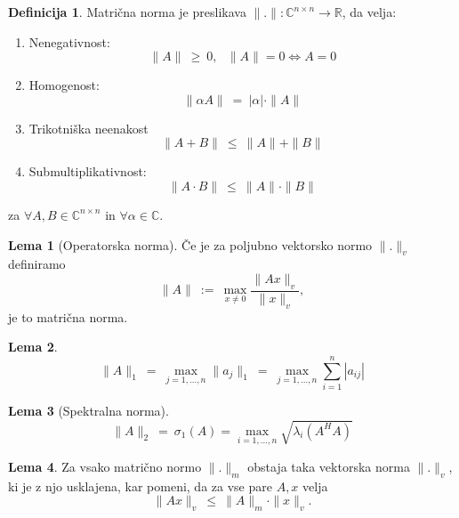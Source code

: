 \documentclass[11pt]{article}
\theoremstyle{definition}
\newtheorem{definicija}{Definicija}[section]
\newtheorem{lema}{Lema}
\begin{document}
\pagebreak

\begin{definicija}

Matrična norma je preslikava $\|.\|: \mathbb{C}^{n \times n} \rightarrow \mathbb{R}$, da velja:
\begin{enumerate}
	\item[1)] Nenegativnost:
	$$\|A\| ~\geq~ 0, ~~~\|A\| = 0 \iff A = 0$$
	\item[2)]Homogenost:
	 $$\|\alpha A\| ~=~ |\alpha| \cdot \|A\|$$
	\item[3)] Trikotniška neenakost
	$$\|A + B\| ~\leq~ \|A\| + \|B\|$$
	\item[4)] Submultiplikativnost:
	$$\|A \cdot B\| ~\leq~ \|A\| \cdot \|B\|$$
\end{enumerate}
za $\forall A, B \in \mathbb{C}^{n \times n}$ in $\forall \alpha \in \mathbb{C}$.

\end{definicija}
\vspace{0.5cm}

\begin{lema}[Operatorska norma]

Če je za poljubno vektorsko normo $\|.\|_v$ definiramo 
$$\|A\| ~:=~ \max_{x \neq 0} \frac{\|Ax\|_v}{\|x\|_v},$$
je to matrična norma.

\end{lema}
\vspace{0.5cm}

\begin{lema}

$$\|A\|_1 ~=~ \max_{j = 1, \ldots, n} \|a_j\|_1 ~=~ \max_{j = 1, \ldots, n} \sum_{i=1}^n |a_{ij}|$$

\end{lema}
\vspace{0.5cm}

\begin{lema}[Spektralna norma]

$$\|A\|_2 ~=~ \sigma_1 (A) = \max_{i = 1, \ldots, n} \sqrt{\lambda_i (A^H A)}$$

\end{lema}
\vspace{0.5cm}

\begin{lema}

Za vsako matrično normo $\|.\|_m$ obstaja taka vektorska norma $\|.\|_v$, ki je z njo usklajena, kar pomeni, da za vse pare $A, x$ velja
$$\|A x\|_v ~\leq~ \|A\|_m \cdot \|x\|_v.$$

\end{lema}
\vspace{0.5cm}
\end{document}
